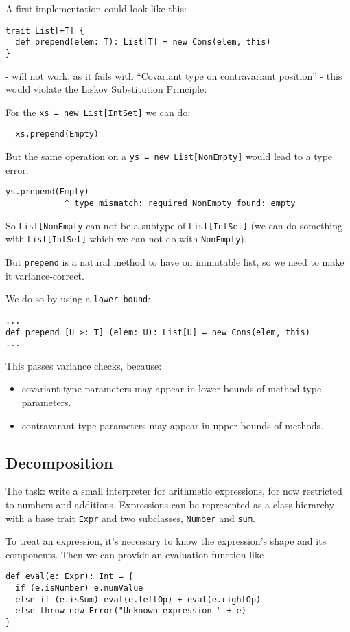 \documentclass{scrartcl}
\newcommand{\term}[1]{\verb~#1~} %
\begin{document}
A first implementation could look like this:
\begin{lstlisting}
trait List[+T] {
  def prepend(elem: T): List[T] = new Cons(elem, this)
}
\end{lstlisting}
- will not work, as it fails with ``Covariant type on contravariant position'' -
this would violate the Liskov Substitution Principle:

For the \lstinline|xs = new List[IntSet]| we can do:
\begin{lstlisting}
  xs.prepend(Empty)
\end{lstlisting}

But the same operation on a \lstinline|ys = new List[NonEmpty]| would lead to a
type error: 
\begin{lstlisting}
ys.prepend(Empty)
            ^ type mismatch: required NonEmpty found: empty
\end{lstlisting}
So \lstinline|List[NonEmpty| can not be a subtype of \lstinline|List[IntSet]|
(we can do something with \lstinline|List[IntSet]| which we can not do with
\lstinline|NonEmpty|).

But \lstinline|prepend| is a natural method to have on immutable list, so we
need to make it variance-correct.

We do so by using a \term{lower bound}:
\begin{lstlisting}
...
def prepend [U >: T] (elem: U): List[U] = new Cons(elem, this)
...
\end{lstlisting}
This passes variance checks, because:
\begin{itemize}
\item covariant type parameters may appear in lower bounds of method type
  parameters.
\item contravarant type parameters may appear in upper bounds of methods.
\end{itemize}

\subsection{Decomposition}
\label{sec:Decomposition}
The task: write a small interpreter for arithmetic expressions, for now
restricted to numbers and additions. Expressions can be represented as a class
hierarchy with a base trait \lstinline|Expr| and two subclasses,
\lstinline|Number| and \lstinline|sum|.

To treat an expression, it's necessary to know the expression's shape and its
components. Then we can provide an evaluation function like 
\begin{lstlisting}
def eval(e: Expr): Int = {
  if (e.isNumber) e.numValue
  else if (e.isSum) eval(e.leftOp) + eval(e.rightOp)
  else throw new Error("Unknown expression " + e)
}
\end{lstlisting}
\end{document}
